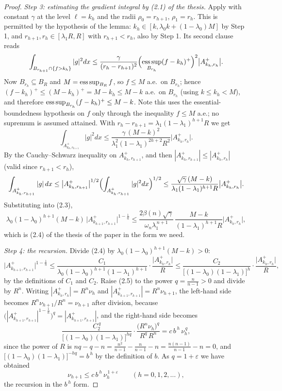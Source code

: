 \begin{proof}
\emph{Step 3: estimating the gradient integral by (2.1) of the thesis.}  Apply
 with constant $\gamma$ at the level $\ell=k_h$ and
the radii $\rho_0=r_{h+1}$, $\rho_1=r_h$.  This is permitted by the hypothesis of
the lemma: $k_h\in[k,\lambda_0k+(1-\lambda_0)M]$ by Step 1, and
$r_{h+1},r_h\in[\lambda_1R,R]$ with $r_{h+1}<r_h$, also by Step 1.  Its second
clause reads
\[
\int_{B_{r_{h+1}}\cap\{f>k_h\}}|g|^2dx
\le\frac{\gamma}{(r_h-r_{h+1})^2}
\Bigl(\operatorname*{ess\,sup}_{B_{r_h}}(f-k_h)^+\Bigr)^{2}\bigl|A^+_{k_h,r_h}\bigr| .
\]
Now $B_{r_h}\subseteq B_R$ and $M=\operatorname*{ess\,sup}_{B_R}f$, so $f\le M$ a.e.\ on
$B_{r_h}$; hence $(f-k_h)^+\le(M-k_h)^+=M-k_h\le M-k$ a.e.\ on $B_{r_h}$ (using
$k\le k_h<M$), and therefore
$\operatorname*{ess\,sup}_{B_{r_h}}(f-k_h)^+\le M-k$.  Note this uses the essential-boundedness
hypothesis on $f$ only through the inequality $f\le M$ a.e.; no supremum is
assumed attained.  With $r_h-r_{h+1}=\lambda_1(1-\lambda_1)^{h+1}R$ we get
\[
\int_{A^+_{k_h,r_{h+1}}}|g|^2dx
\le\frac{\gamma\,(M-k)^2}{\lambda_1^2(1-\lambda_1)^{2h+2}R^2}\bigl|A^+_{k_h,r_h}\bigr| .
\]
By the Cauchy--Schwarz inequality on $A^+_{k_h,r_{h+1}}$, and then
$|A^+_{k_h,r_{h+1}}|\le|A^+_{k_h,r_h}|$ (valid since $r_{h+1}<r_h$),
\[
\int_{A^+_{k_h,r_{h+1}}}|g|\,dx
\le\bigl|A^+_{k_h,r_{h+1}}\bigr|^{1/2}
\Bigl(\int_{A^+_{k_h,r_{h+1}}}|g|^2dx\Bigr)^{1/2}
\le\frac{\sqrt\gamma\,(M-k)}{\lambda_1(1-\lambda_1)^{h+1}R}\bigl|A^+_{k_h,r_h}\bigr| .
\]
Substituting into (2.3),
\[
\lambda_0(1-\lambda_0)^{h+1}(M-k)\,\bigl|A^+_{k_{h+1},r_{h+1}}\bigr|^{1-\frac1n}
\le\frac{2\beta(n)\sqrt\gamma}{\omega_n\lambda_1^{\,n+1}}\,
\frac{M-k}{(1-\lambda_1)^{h+1}R}\bigl|A^+_{k_h,r_h}\bigr| ,
\tag{2.4}
\]
which is (2.4) of the thesis of the paper in the form we need.

\emph{Step 4: the recursion.}  Divide (2.4) by
$\lambda_0(1-\lambda_0)^{h+1}(M-k)>0$:
\[
\bigl|A^+_{k_{h+1},r_{h+1}}\bigr|^{1-\frac1n}
\le\frac{C_1}{\lambda_0(1-\lambda_0)^{h+1}(1-\lambda_1)^{h+1}}
\cdot\frac{\bigl|A^+_{k_h,r_h}\bigr|}{R}
\le\frac{C_2}{\bigl[(1-\lambda_0)(1-\lambda_1)\bigr]^{h}}
\cdot\frac{\bigl|A^+_{k_h,r_h}\bigr|}{R} ,
\tag{2.5}
\]
by the definitions of $C_1$ and $C_2$.  Raise (2.5) to the power
$q=\frac n{n-1}>0$ and divide by $R^n$.  Writing
$|A^+_{k_h,r_h}|=R^n\nu_h$ and $|A^+_{k_{h+1},r_{h+1}}|=R^n\nu_{h+1}$, the
left-hand side becomes
$R^{n}\nu_{h+1}\big/R^{n}=\nu_{h+1}$ after division, because
$\bigl(|A^+_{k_{h+1},r_{h+1}}|^{1-\frac1n}\bigr)^{q}=|A^+_{k_{h+1},r_{h+1}}|$,
and the right-hand side becomes
\[
\frac{C_2^{\,q}}{\bigl[(1-\lambda_0)(1-\lambda_1)\bigr]^{hq}}
\cdot\frac{\bigl(R^n\nu_h\bigr)^{q}}{R^{q}\,R^n}
=c\,b^{\,h}\,\nu_h^{\,q},
\]
since the power of $R$ is $nq-q-n=\frac{n^2}{n-1}-\frac n{n-1}-n
=\frac{n(n-1)}{n-1}-n=0$, and
$\bigl[(1-\lambda_0)(1-\lambda_1)\bigr]^{-hq}=b^{\,h}$ by the definition of $b$.
As $q=1+\varepsilon$ we have obtained
\[
\nu_{h+1}\le c\,b^{\,h}\,\nu_h^{\,1+\varepsilon}\qquad(h=0,1,2,\dots),
\tag{2.6}
\]
the recursion in the $b^{\,h}$ form.


\end{proof}
